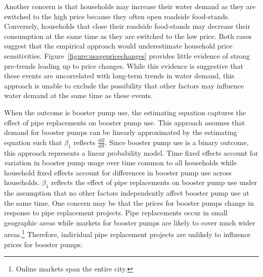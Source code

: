 \documentclass[12pt,table]{article}
\begin{document}
Another concern is that households may increase their water demand as they are switched to the high price because they often open roadside food-stands.  Conversely, households that close their roadside food-stands may decrease their consumption at the same time as they are switched to the low price.  Both cases suggest that the empirical approach would underestimate household price sensitivities.  Figure~\ref{figure:usagepricechanges} provides little evidence of strong pre-trends leading up to price changes.  While this evidence is suggestive that these events are uncorrelated with long-term trends in water demand, this approach is unable to exclude the possibility that other factors may influence water demand at the same time as these events.

When the outcome is booster pump use, the estimating equation captures the effect of pipe replacements on booster pump use.  This approach assumes that demand for booster pumps can be linearly approximated by the estimating equation such that $\beta_1$ reflects $\frac{dB}{dR}$.  Since booster pump use is a binary outcome, this approach represents a linear probability model.  Time fixed effects account for variation in booster pump usage over time common to all households while household fixed effects account for differences in booster pump use across households.  $\beta_1$ reflects the effect of pipe replacements on booster pump use under the assumption that no other factors independently affect booster pump use at the same time.  One concern may be that the prices for booster pumps change in response to pipe replacement projects.  Pipe replacements occur in small geographic areas while markets for booster pumps are likely to cover much wider areas.\footnote{Online markets span the entire city.}  Therefore, individual pipe replacement projects are unlikely to influence prices for booster pumps.

\end{document}
